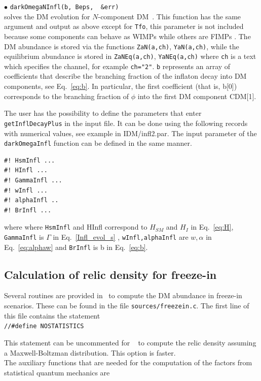 \documentclass[12pt,a4paper]{article}
\begin{document}
\noindent
$\bullet$ \verb|darkOmegaNInfl(b, Beps,  &err) |\\
solves the DM evolution 
 for $N$-component DM~\cite{Alguero:2023zol}. This function has the same argument and output as above except for \verb|Tfo|, this parameter is not included because some components can behave as WIMPs while others are FIMPs .
The DM abundance is stored via the functions {\tt ZaN(a,ch)}, \verb|YaN(a,ch)|, while the equilibrium abundance is stored in {\tt ZaNEq(a,ch)}, \verb|YaNEq(a,ch)| where \verb|ch| is a text which specifies the channel, for example {\tt ch="2"}. {\tt b} represents an array of coefficients that describe the branching fraction of the inflaton decay into DM components, see Eq.~\eqref{eq:b}. In particular, the first coefficient (that is, b[0]) corresponds  to the branching fraction of $\phi$ into the first DM component CDM[1].
 
The user has the possibility to define the parameters that enter \verb|getInflDecayPlus| 
 in the input  file. It can be done using the following records with numerical values, see example in IDM/infl2.par. The  input parameter  of the \verb|darkOmegaInfl| function can be defined in the same manner. 
\begin{verbatim}
#! HsmInfl ... 
#! HInfl ... 
#! GammaInfl ...
#! wInfl ...
#! alphaInfl ..
#! BrInfl ... 
\end{verbatim}
where
where {\tt HsmInfl} and {HInfl} correspond to $H_{SM}$ and $H_I$ in Eq.~\ref{eq:H}, {\tt GammaInfl} is $\Gamma$ in Eq.~\ref{Infl_evol_s} , \verb|wInfl,alphaInfl| are $w,\alpha$ in 
Eq.~\ref{eq:alphaw} and \verb|BrInfl| is b in Eq.~\ref{eq:b}.

 
   
\subsection{Calculation of relic density for freeze-in}
\label{sec:routines:freeze-in} 

Several routines are provided in \micro~to compute the DM abundance in freeze-in scenarios. These can be found in the file \verb|sources/freezein.c|. The first line of this file contains the statement \\
\verb|//#define NOSTATISTICS|

\noindent
This statement can be uncommented for \micro~ to compute the relic density assuming a Maxwell-Boltzman distribution. This option is faster. 
\\
The auxiliary functions that are needed for the computation of the factors from statistical quantum mechanics are 
\end{document}
